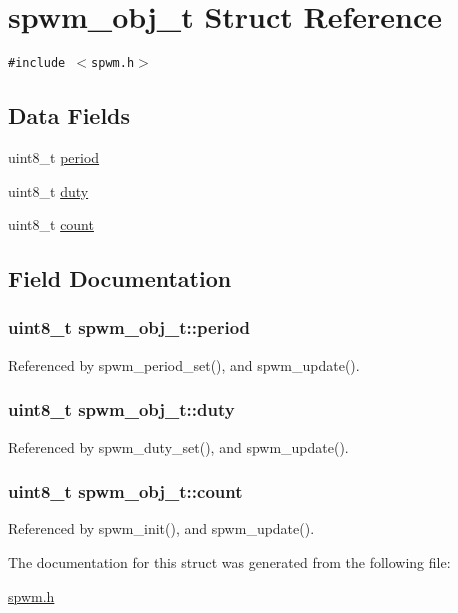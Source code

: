 \hypertarget{structspwm__obj__t}{
\section{spwm\_\-obj\_\-t Struct Reference}
\label{structspwm__obj__t}
}
{\tt \#include $<$spwm.h$>$}

\subsection*{Data Fields}
\begin{CompactItemize}
\item 
uint8\_\-t \hyperlink{structspwm__obj__t_8d6ad3fbdd91fea089d6756c2a0829e4}{period}
\item 
uint8\_\-t \hyperlink{structspwm__obj__t_a70fca32d7cd38dc3c6d67757086efe8}{duty}
\item 
uint8\_\-t \hyperlink{structspwm__obj__t_138a84aa72e3c0ae05c032aab06cc06d}{count}
\end{CompactItemize}


\subsection{Field Documentation}
\hypertarget{structspwm__obj__t_8d6ad3fbdd91fea089d6756c2a0829e4}{
\subsubsection{\setlength{\rightskip}{0pt plus 5cm}uint8\_\-t {\bf spwm\_\-obj\_\-t::period}}}
\label{structspwm__obj__t_8d6ad3fbdd91fea089d6756c2a0829e4}




Referenced by spwm\_\-period\_\-set(), and spwm\_\-update().\hypertarget{structspwm__obj__t_a70fca32d7cd38dc3c6d67757086efe8}{
\subsubsection{\setlength{\rightskip}{0pt plus 5cm}uint8\_\-t {\bf spwm\_\-obj\_\-t::duty}}}
\label{structspwm__obj__t_a70fca32d7cd38dc3c6d67757086efe8}




Referenced by spwm\_\-duty\_\-set(), and spwm\_\-update().\hypertarget{structspwm__obj__t_138a84aa72e3c0ae05c032aab06cc06d}{
\subsubsection{\setlength{\rightskip}{0pt plus 5cm}uint8\_\-t {\bf spwm\_\-obj\_\-t::count}}}
\label{structspwm__obj__t_138a84aa72e3c0ae05c032aab06cc06d}




Referenced by spwm\_\-init(), and spwm\_\-update().

The documentation for this struct was generated from the following file:\begin{CompactItemize}
\item 
\hyperlink{spwm_8h}{spwm.h}\end{CompactItemize}
